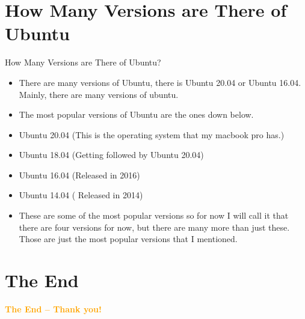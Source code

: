 \documentclass[aspectratio=43]{beamer}
\begin{document}
\section{How Many Versions are There of Ubuntu}
\begin{frame}{How Many Versions are There of Ubuntu?}
\begin{itemize}
\item There are many versions of Ubuntu, there is Ubuntu 20.04 or Ubuntu 16.04. Mainly, there are many versions of ubuntu.
\item The most popular versions of Ubuntu are the ones down below.


\item Ubuntu 20.04 (This is the operating system that my macbook pro has.)
\item Ubuntu 18.04 (Getting followed by Ubuntu 20.04)
\item Ubuntu 16.04 (Released in 2016)
\item Ubuntu 14.04 ( Released in 2014)
\item These are some of the most popular versions so for now I will call it that there are four versions for now, but there are many more than just these. Those are just the most popular versions that I mentioned. 
\end{itemize}

 


\end{frame}


	
\section{The End}
    \begin{frame}{ }
        \centering
            \Huge\bfseries
        \textcolor{orange}{The End -- Thank you!}
    \end{frame}
\end{document}
